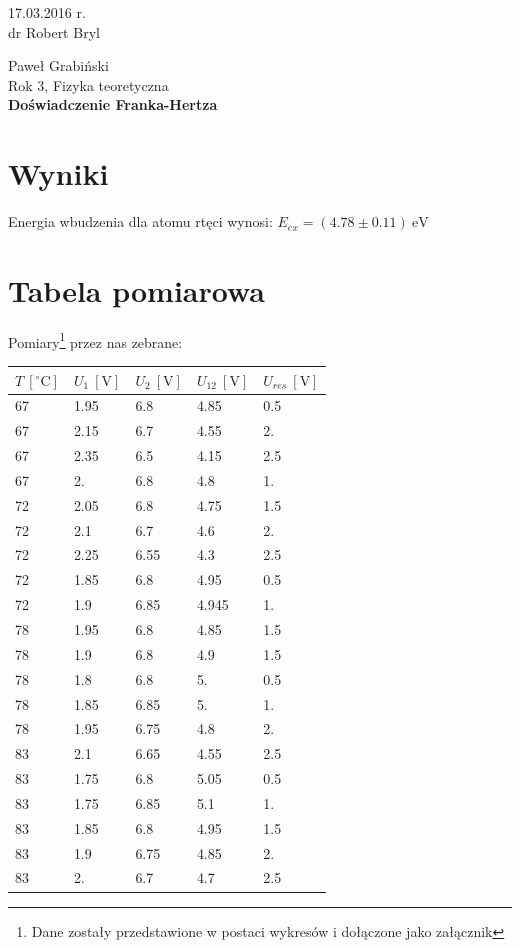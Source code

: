 \documentclass[paper=a4, fontsize=12pt]{scrartcl}
\begin{document}
\begin{flushright}
17.03.2016 r.\\
dr Robert Bryl
\end{flushright}Paweł Grabiński\\
Rok 3, Fizyka teoretyczna\\[0.5cm]
{\huge \bf Doświadczenie Franka-Hertza}
\section{Wyniki}
Energia wbudzenia dla atomu rtęci wynosi: $E_{ex}=(4.78\pm0.11)\:\mathrm{eV}$
\section{Tabela pomiarowa}
\label{sec:tabpom}
Pomiary\footnote{Dane zostały przedstawione w postaci wykresów i dołączone jako załącznik} przez nas zebrane:

\begin{table}[h]
\begin{center}
	\begin{tabular}{|l|l|l|l|l|}
		\hline
		$T\:[^\circ\mathrm{C}]$ & $U_{1}\:[\mathrm{V}]$ & $U_{2}\:[\mathrm{V}]$ & $U_{12}\:[\mathrm{V}]$ & $U_{res}\:[\mathrm{V}]$ \\ \hline
		67 & 1.95 & 6.8  & 4.85  & 0.5 \\ \hline
		67  & 2.15 & 6.7  & 4.55  & 2.  \\ \hline
		67  & 2.35 & 6.5  & 4.15  & 2.5 \\ \hline
		67  & 2.   & 6.8  & 4.8   & 1.  \\ \hline
		72  & 2.05 & 6.8  & 4.75  & 1.5 \\ \hline
		72  & 2.1  & 6.7  & 4.6   & 2.  \\ \hline
		72  & 2.25 & 6.55 & 4.3   & 2.5 \\ \hline
		72  & 1.85 & 6.8  & 4.95  & 0.5 \\ \hline
		72  & 1.9  & 6.85 & 4.945 & 1.  \\ \hline
		78  & 1.95 & 6.8  & 4.85  & 1.5 \\ \hline
		78  & 1.9  & 6.8  & 4.9   & 1.5 \\ \hline
		78  & 1.8  & 6.8  & 5.    & 0.5 \\ \hline
		78  & 1.85 & 6.85 & 5.    & 1.  \\ \hline
		78  & 1.95 & 6.75 & 4.8   & 2.  \\ \hline
		83  & 2.1  & 6.65 & 4.55  & 2.5 \\ \hline
		83  & 1.75 & 6.8  & 5.05  & 0.5 \\ \hline
		83  & 1.75 & 6.85 & 5.1   & 1.  \\ \hline
		83  & 1.85 & 6.8  & 4.95  & 1.5 \\ \hline
		83  & 1.9  & 6.75 & 4.85  & 2.  \\ \hline
		83  & 2.   & 6.7  & 4.7   & 2.5 \\ \hline
	\end{tabular}
\end{center}
\end{table}
\end{document}
